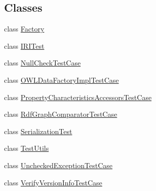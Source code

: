 \subsection*{Classes}
\begin{DoxyCompactItemize}
\item 
class \hyperlink{classorg_1_1semanticweb_1_1owlapi_1_1api_1_1test_1_1_factory}{Factory}
\item 
class \hyperlink{classorg_1_1semanticweb_1_1owlapi_1_1api_1_1test_1_1_i_r_i_test}{I\-R\-I\-Test}
\item 
class \hyperlink{classorg_1_1semanticweb_1_1owlapi_1_1api_1_1test_1_1_null_check_test_case}{Null\-Check\-Test\-Case}
\item 
class \hyperlink{classorg_1_1semanticweb_1_1owlapi_1_1api_1_1test_1_1_o_w_l_data_factory_impl_test_case}{O\-W\-L\-Data\-Factory\-Impl\-Test\-Case}
\item 
class \hyperlink{classorg_1_1semanticweb_1_1owlapi_1_1api_1_1test_1_1_property_characteristics_accessors_test_case}{Property\-Characteristics\-Accessors\-Test\-Case}
\item 
class \hyperlink{classorg_1_1semanticweb_1_1owlapi_1_1api_1_1test_1_1_rdf_graph_comparator_test_case}{Rdf\-Graph\-Comparator\-Test\-Case}
\item 
class \hyperlink{classorg_1_1semanticweb_1_1owlapi_1_1api_1_1test_1_1_serialization_test}{Serialization\-Test}
\item 
class \hyperlink{classorg_1_1semanticweb_1_1owlapi_1_1api_1_1test_1_1_test_utils}{Test\-Utils}
\item 
class \hyperlink{classorg_1_1semanticweb_1_1owlapi_1_1api_1_1test_1_1_unchecked_exception_test_case}{Unchecked\-Exception\-Test\-Case}
\item 
class \hyperlink{classorg_1_1semanticweb_1_1owlapi_1_1api_1_1test_1_1_verify_version_info_test_case}{Verify\-Version\-Info\-Test\-Case}
\end{DoxyCompactItemize}
